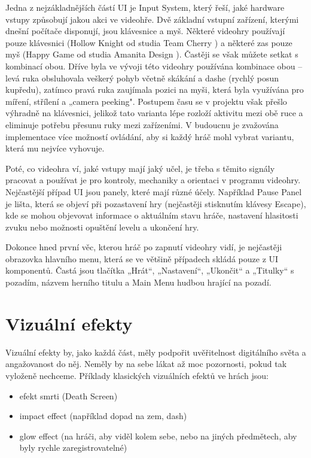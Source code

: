 Jedna z nejzákladnějších částí UI je Input System, který řeší, jaké hardware vstupy způsobují jakou akci ve videohře. Dvě základní vstupní zařízení, kterými dnešní počítače disponují, jsou klávesnice a myš. Některé videohry používají pouze klávesnici (Hollow Knight od studia Team Cherry \cite{hollow-knight}) a některé zas pouze myš (Happy Game od studia Amanita Design \cite{happy-game}). Častěji se však můžete setkat s kombinací obou. Dříve byla ve vývoji této videohry používána kombinace obou -- levá ruka obsluhovala veškerý pohyb včetně skákání a dashe (rychlý posun kupředu), zatímco pravá ruka zaujímala pozici na myši, která byla využívána pro míření, střílení a „camera peeking". Postupem času se v projektu však přešlo výhradně na klávesnici, jelikož tato varianta lépe rozloží aktivitu mezi obě ruce a eliminuje potřebu přesunu ruky mezi zařízeními. V budoucnu je zvažována implementace více možností ovládání, aby si každý hráč mohl vybrat variantu, která mu nejvíce vyhovuje.

Poté, co videohra ví, jaké vstupy mají jaký učel, je třeba s těmito signály pracovat a používat je pro kontroly, mechaniky a orientaci v programu videohry. Nejčastější případ UI jsou panely, které mají různé účely. Například Pause Panel je lišta, která se objeví při pozastavení hry (nejčastěji stisknutím klávesy Escape), kde se mohou objevovat informace o aktuálním stavu hráče, nastavení hlasitosti zvuku nebo možnosti opuštění levelu a ukončení hry.

Dokonce hned první věc, kterou hráč po zapnutí videohry vidí, je nejčastěji obrazovka hlavního menu, která se ve většině případech skládá pouze z UI komponentů. Častá jsou tlačítka „Hrát“, „Nastavení“, „Ukončit“ a „Titulky“ s pozadím, názvem herního titulu a Main Menu hudbou hrající na pozadí.

\section{Vizuální efekty}
Vizuální efekty by, jako každá část, měly podpořit uvěřitelnost digitálního světa a angažovanost do něj. Neměly by na sebe lákat až moc pozornosti, pokud tak vyloženě nechceme. Příklady klasických vizuálních efektů ve hrách jsou:

\begin{itemize}
    \item efekt smrti (Death Screen) 
    \item impact effect (například dopad na zem, dash)
    \item glow effect (na hráči, aby viděl kolem sebe, nebo na jiných předmětech, aby byly rychle zaregistrovatelné)
\end{itemize}

